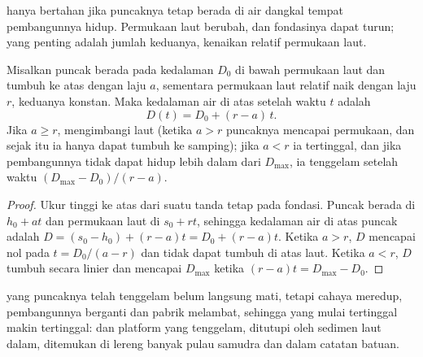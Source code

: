 hanya bertahan jika puncaknya tetap berada di air dangkal tempat pembangunnya hidup. Permukaan laut berubah, dan fondasinya dapat turun; yang penting adalah jumlah keduanya, kenaikan relatif permukaan laut.

\begin{proposition}\label{prop:b1:chemical-biogenic-sediments:keep-up}
Misalkan puncak  berada pada kedalaman $D_0$ di bawah permukaan laut dan tumbuh ke atas dengan laju $a$, sementara permukaan laut relatif naik dengan laju $r$, keduanya konstan. Maka kedalaman air di atas  setelah waktu $t$ adalah
\[
D(t) = D_0 + (r - a)\,t .
\]
Jika $a \ge r$,  mengimbangi laut (ketika $a > r$ puncaknya mencapai permukaan, dan sejak itu ia hanya dapat tumbuh ke samping); jika $a < r$ ia tertinggal, dan jika pembangunnya tidak dapat hidup lebih dalam dari $D_{\max}$, ia tenggelam setelah waktu $(D_{\max} - D_0)/(r - a)$.
\end{proposition}

\begin{proof}
Ukur tinggi ke atas dari suatu tanda tetap pada fondasi. Puncak  berada di $h_0 + a t$ dan permukaan laut di $s_0 + r t$, sehingga kedalaman air di atas
puncak adalah $D = (s_0 - h_0) + (r - a)t = D_0 + (r-a)t$. Ketika $a > r$, $D$ mencapai nol pada $t = D_0/(a-r)$ dan  tidak dapat tumbuh di atas laut. Ketika
$a < r$, $D$ tumbuh secara linier dan mencapai $D_{\max}$ ketika $(r-a)t = D_{\max} -
D_0$.
\end{proof}

 yang puncaknya telah tenggelam belum langsung mati, tetapi cahaya meredup, pembangunnya berganti dan pabrik melambat, sehingga  yang mulai tertinggal makin tertinggal:  dan platform yang tenggelam, ditutupi oleh sedimen laut dalam, ditemukan di lereng banyak pulau samudra dan dalam catatan batuan.

